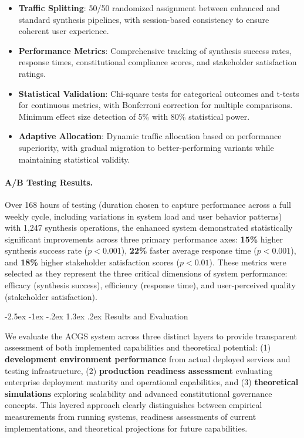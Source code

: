 \documentclass[manuscript,screen,9pt]{acmart}
\makeatletter
\renewcommand\section{\@startsection{section}{1}{\z@}%
  {-2.5ex \@plus -1ex \@minus -.2ex}%
  {1.3ex \@plus.2ex}%
  {\normalfont\Large\bfseries}}
\makeatother
\begin{document}
\begin{itemize}[leftmargin=*,itemsep=1pt,parsep=1pt]
	\item \textbf{Traffic Splitting}: 50/50 randomized assignment between enhanced and standard synthesis pipelines, with session-based consistency to ensure coherent user experience.
	\item \textbf{Performance Metrics}: Comprehensive tracking of synthesis success rates, response times, constitutional compliance scores, and stakeholder satisfaction ratings.
	\item \textbf{Statistical Validation}: Chi-square tests for categorical outcomes and t-tests for continuous metrics, with Bonferroni correction for multiple comparisons. Minimum effect size detection of 5\% with 80\% statistical power.
	\item \textbf{Adaptive Allocation}: Dynamic traffic allocation based on performance superiority, with gradual migration to better-performing variants while maintaining statistical validity.
\end{itemize}

\paragraph{A/B Testing Results.} Over 168 hours of testing (duration chosen to capture performance across a full weekly cycle, including variations in system load and user behavior patterns) with 1,247 synthesis operations, the enhanced system demonstrated statistically significant improvements across three primary performance axes: \textbf{15\%} higher synthesis success rate ($p < 0.001$), \textbf{22\%} faster average response time ($p < 0.001$), and \textbf{18\%} higher stakeholder satisfaction scores ($p < 0.01$). These metrics were selected as they represent the three critical dimensions of system performance: efficacy (synthesis success), efficiency (response time), and user-perceived quality (stakeholder satisfaction).

\section{Results and Evaluation}
\label{sec:results}

We evaluate the ACGS system across three distinct layers to provide transparent assessment of both implemented capabilities and theoretical potential: (1) \textbf{development environment performance} from actual deployed services and testing infrastructure, (2) \textbf{production readiness assessment} evaluating enterprise deployment maturity and operational capabilities, and (3) \textbf{theoretical simulations} exploring scalability and advanced constitutional governance concepts. This layered approach clearly distinguishes between empirical measurements from running systems, readiness assessments of current implementations, and theoretical projections for future capabilities.
\end{document}
